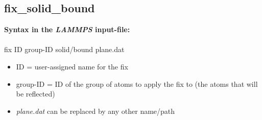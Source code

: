 \documentclass[a4paper,10pt]{scrreprt}
\begin{document}
\subsection{fix\_solid\_bound}
\label{sub:fix_solid_bound}

\textbf{Syntax in the \textit{LAMMPS} input-file:}\\
\\{ fix ID group-ID solid/bound plane.dat}
\begin{itemize}
\item ID = user-assigned name for the fix
\item group-ID = ID of the group of atoms to apply the fix to (the atoms that will be reflected)
\item \textit{plane.dat} can be replaced by any other name/path
\end{itemize}
\end{document}
